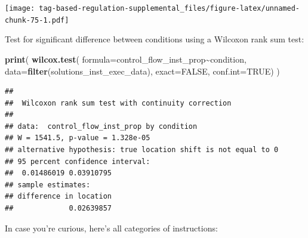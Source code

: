 \documentclass[
]{book}
\newenvironment{Shaded}{\begin{snugshade}}{\end{snugshade}}
\newcommand{\DataTypeTok}[1]{\textcolor[rgb]{0.13,0.29,0.53}{#1}}
\newcommand{\KeywordTok}[1]{\textcolor[rgb]{0.13,0.29,0.53}{\textbf{#1}}}
\newcommand{\NormalTok}[1]{#1}
\newcommand{\OperatorTok}[1]{\textcolor[rgb]{0.81,0.36,0.00}{\textbf{#1}}}
\newcommand{\OtherTok}[1]{\textcolor[rgb]{0.56,0.35,0.01}{#1}}
\begin{document}
\texttt{[image: tag-based-regulation-supplemental\_files/figure-latex/unnamed-chunk-75-1.pdf]}

Test for significant difference between conditions using a Wilcoxon rank sum test:

\begin{Shaded}
\begin{Highlighting}[]
\KeywordTok{print}\NormalTok{(}
  \KeywordTok{wilcox.test}\NormalTok{(}
    \DataTypeTok{formula=}\NormalTok{control\_flow\_inst\_prop}\OperatorTok{\textasciitilde{}}\NormalTok{condition,}
    \DataTypeTok{data=}\KeywordTok{filter}\NormalTok{(solutions\_inst\_exec\_data),}
    \DataTypeTok{exact=}\OtherTok{FALSE}\NormalTok{,}
    \DataTypeTok{conf.int=}\OtherTok{TRUE}\NormalTok{)}
\NormalTok{)}
\end{Highlighting}
\end{Shaded}

\begin{verbatim}
## 
##  Wilcoxon rank sum test with continuity correction
## 
## data:  control_flow_inst_prop by condition
## W = 1541.5, p-value = 1.328e-05
## alternative hypothesis: true location shift is not equal to 0
## 95 percent confidence interval:
##  0.01486019 0.03910795
## sample estimates:
## difference in location 
##             0.02639857
\end{verbatim}

In case you're curious, here's all categories of instructions:
\end{document}
